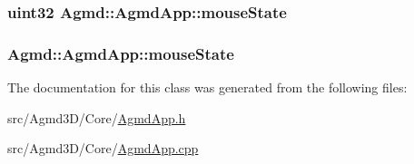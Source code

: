\hypertarget{class_agmd_1_1_agmd_app_ac57faa65a18bb1d5751b25e36364860e}{
\subsubsection[{mouse\+State}]{\setlength{\rightskip}{0pt plus 5cm}uint32 Agmd\+::\+Agmd\+App\+::mouse\+State\hspace{0.3cm}{\ttfamily [protected]}}}\label{class_agmd_1_1_agmd_app_ac57faa65a18bb1d5751b25e36364860e}
\hypertarget{class_agmd_1_1_agmd_app_ae44d69b5ac62fb8ac221140e883132af}{
\subsubsection[{mouse\+State}]{ Agmd\+::\+Agmd\+App\+::mouse\+State\hspace{0.3cm}{\ttfamily [protected]}}}\label{class_agmd_1_1_agmd_app_ae44d69b5ac62fb8ac221140e883132af}


The documentation for this class was generated from the following files\+:\begin{DoxyCompactItemize}
\item 
src/\+Agmd3\+D/\+Core/\hyperlink{_agmd3_d_2_core_2_agmd_app_8h}{Agmd\+App.\+h}\item 
src/\+Agmd3\+D/\+Core/\hyperlink{_agmd3_d_2_core_2_agmd_app_8cpp}{Agmd\+App.\+cpp}\end{DoxyCompactItemize}
